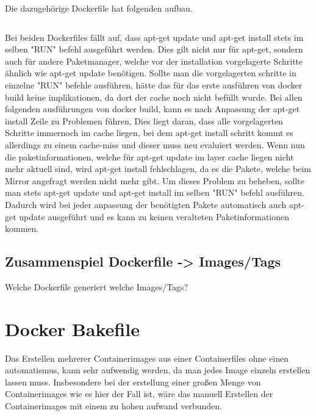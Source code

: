 Die dazugehörige Dockerfile hat folgenden aufbau.

\inputminted{dockerfile}{./code-examples/Dockerfile.spack}

Bei beiden Dockerfiles fällt auf, dass apt-get update und apt-get install stets im selben "RUN" befehl ausgeführt werden. Dies gilt nicht nur für apt-get, sondern auch für andere Paketmanager, welche vor der installation vorgelagerte Schritte ähnlich wie apt-get update benötigen. Sollte man die vorgelagerten schritte in einzelne "RUN" befehle ausführen, hätte das für das erste ausführen von docker build keine implikationen, da dort der cache noch nicht befüllt wurde. Bei allen folgenden ausführungen von docker build, kann es nach Anpassung der apt-get install Zeile zu Problemen führen. Dies liegt daran, dass alle vorgelagerten Schritte immernoch im cache liegen, bei dem apt-get install schritt kommt es allerdings zu einem cache-miss und dieser muss neu evaluiert werden. Wenn nun die paketinformationen, welche für apt-get update im layer cache liegen nicht mehr aktuell sind, wird apt-get install fehlschlagen, da es die Pakete, welche beim Mirror angefragt werden nicht mehr gibt. Um dieses Problem zu beheben, sollte man stets apt-get update und apt-get install im selben "RUN" befehl ausführen. Dadurch wird bei jeder anpassung der benötigten Pakete automatisch auch apt-get update ausgeführt und es kann zu keinen veralteten Paketinformationen kommen. 

\subsection{Zusammenspiel Dockerfile -> Images/Tags}

Welche Dockerfile generiert welche Images/Tags?

\section{Docker Bakefile}

Das Erstellen mehrerer Containerimages aus einer Containerfiles ohne einen automatismus, kann sehr aufwendig werden, da man jedes Image einzeln erstellen lassen muss. Insbesondere bei der erstellung einer großen Menge von Containerimages wie es hier der Fall ist, wäre das manuell Erstellen der Containerimages mit einem zu hohen aufwand verbunden. 

